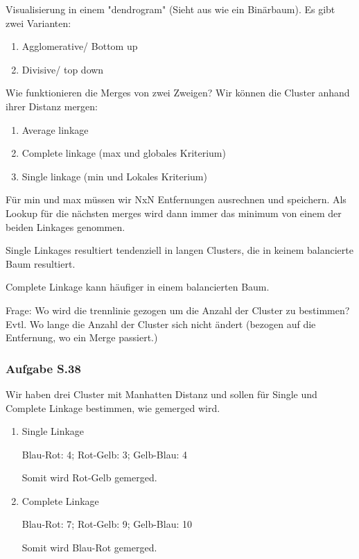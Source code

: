 \documentclass[a4paper]{article}
\begin{document}
Visualisierung in einem "dendrogram" (Sieht aus wie ein Binärbaum). Es gibt zwei Varianten:

\begin{enumerate}
    \item Agglomerative/ Bottom up
    \item Divisive/ top down
\end{enumerate}

Wie funktionieren die Merges von zwei Zweigen? Wir können die Cluster anhand ihrer Distanz mergen:

\begin{enumerate}
    \item Average linkage
    \item Complete linkage (max und globales Kriterium)
    \item Single linkage (min und Lokales Kriterium)
\end{enumerate}

Für min und max müssen wir NxN Entfernungen ausrechnen und speichern. Als Lookup für die nächsten merges wird dann immer das minimum von einem der beiden Linkages genommen.

Single Linkages resultiert tendenziell in langen Clusters, die in keinem balancierte Baum resultiert.

Complete Linkage kann häufiger in einem balancierten Baum.

Frage: Wo wird die trennlinie gezogen um die Anzahl der Cluster zu bestimmen? Evtl. Wo lange die Anzahl der Cluster sich nicht ändert (bezogen auf die Entfernung, wo ein Merge passiert.)

\subsubsection*{Aufgabe S.38}

Wir haben drei Cluster mit Manhatten Distanz und sollen für Single und Complete Linkage bestimmen, wie gemerged wird.

\begin{enumerate}
    \item Single Linkage
    
    Blau-Rot: 4;
    Rot-Gelb: 3;
    Gelb-Blau: 4

    Somit wird Rot-Gelb gemerged.
    \item Complete Linkage
    
    Blau-Rot: 7;
    Rot-Gelb: 9;
    Gelb-Blau: 10

    Somit wird Blau-Rot gemerged.
\end{enumerate}
\end{document}
